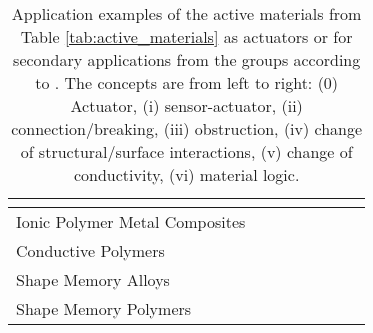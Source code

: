 \documentclass{article}
\begin{document}
\begin{landscape}
\begin{table}[htbp]
\begin{tabular}{|p{3.5cm}|p{1.7cm}|p{1.7cm}|p{1.7cm}|p{1.7cm}|p{1.7cm}|p{1.9cm}|p{1.7cm}|}
			& \cite{Walker2017}
			& 
			& \cite{Giousouf2013} %
			& \cite{Lee2014,Matysek2009,Ashby2022a,Henke2012}
			& \cite{O’Brien2010,Chau2016,Shian2013}
			&  \cite{Henke2017,Hajiesmaili2022}
			\\
			\hline
			Ionic Polymer Metal Composites 		
			& \cite{NematNasser2001,Yamakita2006,Kamamichi2006}
			& \cite{Wang2024c,Punning2007}
			& 
			&  \cite{Yun2011}
			&  \cite{Low2024,Yun2009}
			&  \cite{Lee2008}
			&  \cite{Wang2022a}
			\\
			\hline
			Conductive Polymers		
			& \cite{Baughman1996,Madden2002,Smela1993,Otero1998,Das2012,Wu2005}
			& 
			& 
			&  
			&  
			&  
			&  
			\\
			\hline
			Shape Memory Alloys		
			& \cite{Sofla2008,Benard1998,Kumar2020}
			& \cite{Furst2013} 
			& 
			&  \cite{Megnin2013}
			&  \cite{Manzo2005,Hartl2007,Calkins2010} %
			&  \cite{Hasan2016,Sutapun1998,TabibAzar1999}
			&  
			\\
			\hline
			Shape Memory Polymers 		
			& \cite{Behl2013,Xing2020,Song2015}
			& 
			& 
			&  
			&  \cite{Lin2006,Gandhi2007,McKnight2005}  %
			&  \cite{Wang2022,Wischke2010}
			&  
			\\
			\hline
		\end{tabular}
		\caption{Application examples of the active materials from Table \ref{tab:active_materials} as actuators or for secondary applications from the groups according to \cite{Ehrenhofer2024shapes_review}. The concepts are from left to right: (0) Actuator, (i) sensor-actuator, (ii) connection/breaking, (iii) obstruction, (iv) change of structural/surface interactions, (v) change of conductivity, (vi) material logic.}
		\label{tab:active_applications}
	\end{table}
\end{landscape}



	
	
\end{document}
